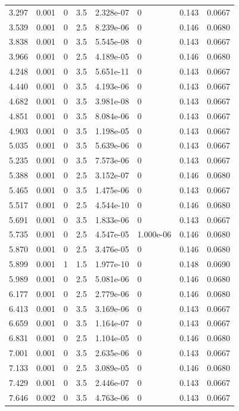 \documentclass[preview]{standalone}
\begin{document}
{{\begin{tabular}{L{1.2cm}C{1.2cm} C{0.3cm}C{0.5cm} C{1.4cm}C{1.4cm} C{1.4cm}C{1.4cm}}
  3.297  &  0.001  & 0     & 3.5 &  2.328e-07  & 0  & 0.143 &  0.0667   \\ 
  3.539  &  0.001  & 0     & 2.5 &  8.239e-06  & 0  & 0.146 &  0.0680   \\ 
  3.838  &  0.001  & 0     & 3.5 &  5.545e-08  & 0  & 0.143 &  0.0667   \\ 
  3.966  &  0.001  & 0     & 2.5 &  4.189e-05  & 0  & 0.146 &  0.0680   \\ 
  4.248  &  0.001  & 0     & 3.5 &  5.651e-11  & 0  & 0.143 &  0.0667   \\ 
  4.440  &  0.001  & 0     & 3.5 &  4.193e-06  & 0  & 0.143 &  0.0667   \\ 
  4.682  &  0.001  & 0     & 3.5 &  3.981e-08  & 0  & 0.143 &  0.0667   \\ 
  4.851  &  0.001  & 0     & 3.5 &  8.084e-06  & 0  & 0.143 &  0.0667   \\ 
  4.903  &  0.001  & 0     & 3.5 &  1.198e-05  & 0  & 0.143 &  0.0667   \\ 
  5.035  &  0.001  & 0     & 3.5 &  5.639e-06  & 0  & 0.143 &  0.0667   \\ 
  5.235  &  0.001  & 0     & 3.5 &  7.573e-06  & 0  & 0.143 &  0.0667   \\ 
  5.388  &  0.001  & 0     & 2.5 &  3.152e-07  & 0  & 0.146 &  0.0680   \\ 
  5.465  &  0.001  & 0     & 3.5 &  1.475e-06  & 0  & 0.143 &  0.0667   \\ 
  5.517  &  0.001  & 0     & 2.5 &  4.544e-10  & 0  & 0.146 &  0.0680   \\ 
  5.691  &  0.001  & 0     & 3.5 &  1.833e-06  & 0  & 0.143 &  0.0667   \\ 
  5.735  &  0.001  & 0     & 2.5 &  4.547e-05  & 1.000e-06  & 0.146 &  0.0680   \\ 
  5.870  &  0.001  & 0     & 2.5 &  3.476e-05  & 0  & 0.146 &  0.0680   \\ 
  5.899  &  0.001  & 1     & 1.5 &  1.977e-10  & 0  & 0.148 &  0.0690   \\ 
  5.989  &  0.001  & 0     & 2.5 &  5.081e-06  & 0  & 0.146 &  0.0680   \\ 
  6.177  &  0.001  & 0     & 2.5 &  2.779e-06  & 0  & 0.146 &  0.0680   \\ 
  6.413  &  0.001  & 0     & 3.5 &  3.169e-06  & 0  & 0.143 &  0.0667   \\ 
  6.659  &  0.001  & 0     & 3.5 &  1.164e-07  & 0  & 0.143 &  0.0667   \\ 
  6.831  &  0.001  & 0     & 2.5 &  1.104e-05  & 0  & 0.146 &  0.0680   \\ 
  7.001  &  0.001  & 0     & 3.5 &  2.635e-06  & 0  & 0.143 &  0.0667   \\ 
  7.133  &  0.001  & 0     & 2.5 &  3.089e-05  & 0  & 0.146 &  0.0680   \\ 
  7.429  &  0.001  & 0     & 3.5 &  2.446e-07  & 0  & 0.143 &  0.0667   \\ 
  7.646  &  0.002  & 0     & 3.5 &  4.763e-06  & 0  & 0.143 &  0.0667   \\ 
\hline 
\end{tabular} 

}}
\end{document}
